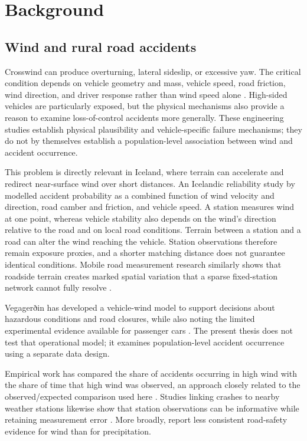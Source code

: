 \chapter{Background}

\section{Wind and rural road accidents}

Crosswind can produce overturning, lateral sideslip, or excessive yaw. The
critical condition depends on vehicle geometry and mass, vehicle speed, road
friction, wind direction, and driver response rather than wind speed alone
\citep{baker1986,baker1994risk}. High-sided vehicles are particularly exposed,
but the physical mechanisms also provide a reason to examine loss-of-control
accidents more generally. These engineering studies establish physical
plausibility and vehicle-specific failure mechanisms; they do not by
themselves establish a population-level association between wind and accident
occurrence.

This problem is directly relevant in Iceland, where terrain can accelerate and
redirect near-surface wind over short distances. An Icelandic reliability
study by \citet{snaebjornsson2007} modelled accident probability as a combined
function of wind velocity and direction, road camber and friction, and vehicle
speed.
A station measures wind at one point, whereas vehicle stability also depends
on the wind's direction relative to the road and on local road conditions.
Terrain between a station and a road can alter the wind reaching the vehicle.
Station observations therefore remain exposure proxies, and a shorter
matching distance does not guarantee identical conditions. Mobile road
measurement research similarly shows that roadside terrain creates marked
spatial variation that a sparse fixed-station network cannot fully resolve
\citep{pu2018}.

Vegagerðin has developed a vehicle-wind model to support decisions about
hazardous conditions and road closures, while also noting the limited
experimental evidence available for passenger cars \citep{hrafnkelsdottir2020}. The present thesis does not test that
operational model; it examines population-level accident occurrence using a
separate data design.

Empirical work has compared the share of accidents occurring in high wind with
the share of time that high wind was observed, an approach closely related to
the observed/expected comparison used here \citep{edwards1994}. Studies linking
crashes to nearby weather stations likewise show that station observations can
be informative while retaining measurement error \citep{young2007}. More broadly,
\citet{theofilatos2014} report less consistent road-safety evidence for wind
than for precipitation.

